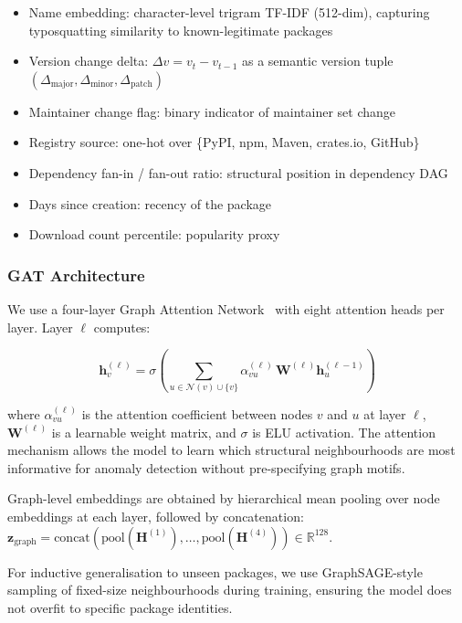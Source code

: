 \documentclass[sigconf,nonacm]{acmart}
\begin{document}
\begin{itemize}
  \item Name embedding: character-level trigram TF-IDF (512-dim), capturing
        typosquatting similarity to known-legitimate packages
  \item Version change delta: $\Delta v = v_t - v_{t-1}$ as a semantic version
        tuple $(\Delta_\text{major}, \Delta_\text{minor}, \Delta_\text{patch})$
  \item Maintainer change flag: binary indicator of maintainer set change
  \item Registry source: one-hot over \{PyPI, npm, Maven, crates.io, GitHub\}
  \item Dependency fan-in / fan-out ratio: structural position in dependency DAG
  \item Days since creation: recency of the package
  \item Download count percentile: popularity proxy
\end{itemize}

\subsubsection{GAT Architecture}

We use a four-layer Graph Attention Network~\cite{velickovic2018gat} with eight
attention heads per layer. Layer $\ell$ computes:

\begin{equation}
  \mathbf{h}_v^{(\ell)} = \sigma\!\left(
    \sum_{u \in \mathcal{N}(v) \cup \{v\}} \alpha_{vu}^{(\ell)}\,
    \mathbf{W}^{(\ell)} \mathbf{h}_u^{(\ell-1)}
  \right)
\end{equation}

where $\alpha_{vu}^{(\ell)}$ is the attention coefficient between nodes $v$ and $u$
at layer $\ell$, $\mathbf{W}^{(\ell)}$ is a learnable weight matrix, and $\sigma$
is ELU activation. The attention mechanism allows the model to learn which structural
neighbourhoods are most informative for anomaly detection without pre-specifying
graph motifs.

Graph-level embeddings are obtained by hierarchical mean pooling over node embeddings
at each layer, followed by concatenation:
$\mathbf{z}_\text{graph} = \text{concat}(\text{pool}(\mathbf{H}^{(1)}), \ldots,
\text{pool}(\mathbf{H}^{(4)})) \in \mathbb{R}^{128}$.

For inductive generalisation to unseen packages, we use GraphSAGE-style sampling
of fixed-size neighbourhoods during training, ensuring the model does not overfit
to specific package identities.
\end{document}
